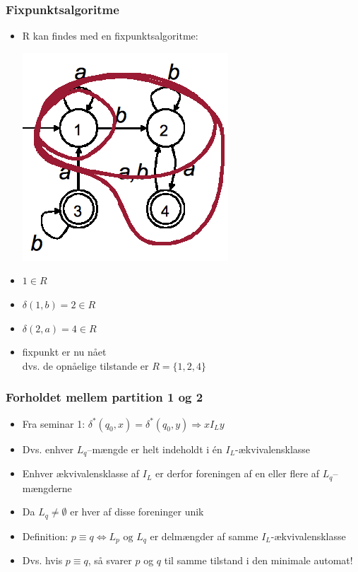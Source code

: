 \documentclass[]{beamer}
\begin{document}
\begin{frame}
\frametitle{Fixpunktsalgoritme}
\begin{itemize}[<+->]
\item R kan findes med en fixpunktsalgoritme:

  \includegraphics[scale=0.4]{images/2_seminar_fixpoint}
\item $1\in R$
\item $\delta (1, b)=2\in R$
\item $\delta (2, a)=4\in R$
\item fixpunkt er nu nået\\
dvs. de opnåelige tilstande er $R=\{1,2,4\}$
\end{itemize}
\end{frame}

\begin{frame}
\frametitle{Forholdet mellem partition 1 og 2}
\begin{itemize}[<+->]
\item Fra seminar 1: $\delta^*(q_0, x)=\delta^*(q_0, y)  \Rightarrow  x I_L y$
\item Dvs. enhver $L_q$–mængde er helt indeholdt i 
én $I_L$-ækvivalensklasse
\item
Enhver ækvivalensklasse af $I_L$ er derfor foreningen af 
en eller flere af $L_q$–mængderne
\item
Da $L_q \neq \emptyset$ er hver af disse foreninger unik
\item
Definition: $p \equiv q  \Leftrightarrow  L_p \text{ og } L_q$ er delmængder
af samme $I_L$-ækvivalensklasse
\item
Dvs. hvis $p \equiv q$, så svarer $p$ og $q$ til samme tilstand i den minimale automat!
\end{itemize}
\end{frame}
\end{document}
